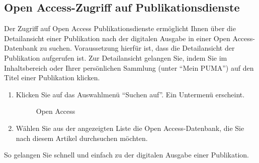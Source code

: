 \begin{description}
\subsection{Open Access-Zugriff auf Publikationsdienste}%
Der Zugriff auf Open Access Publikationsdienste ermöglicht Ihnen über die Detailansicht einer Publikation nach der digitalen Ausgabe in einer Open Access-Datenbank zu suchen. Voraussetzung hierfür ist, dass die Detailansicht der Publikation aufgerufen ist. Zur Detailansicht gelangen Sie, indem Sie im Inhaltsbereich oder Ihrer persönlichen Sammlung (unter \enquote{Mein PUMA}) auf den Titel einer Publikation klicken. 
\begin{enumerate}
    \item Klicken Sie auf das Auswahlmenü \enquote{Suchen auf}. Ein Untermenü erscheint.
\begin{figure}[h!]
 \centering
 \caption{Open Access}
 \label{figure033}
\end{figure}
    \item Wählen Sie aus der angezeigten Liste die Open Access-Datenbank, die Sie nach diesem Artikel durchsuchen möchten. 
\end{enumerate}
 So gelangen Sie schnell und einfach zu der digitalen Ausgabe einer Publikation. 

\end{description}
